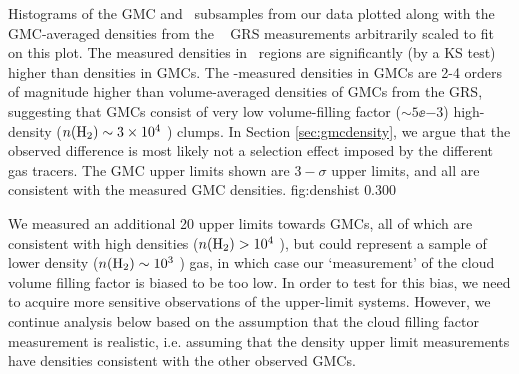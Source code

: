 
{Histograms of the GMC and \uchii\ subsamples from our data plotted along with
the GMC-averaged densities from the \thirteenco\ \citet{Roman-Duval2010} GRS
measurements arbitrarily scaled to fit on this plot.  The measured densities in
\uchii\ regions are significantly (by a KS test) higher than densities in GMCs.
The \formaldehyde-measured densities in GMCs are 2-4 orders of magnitude higher
than volume-averaged densities of GMCs from the GRS, suggesting that GMCs
consist of very low volume-filling factor ($\sim5\ee{-3}$) high-density
($n(\textrm{H}_{2})\sim3\times10^{4}$ \percc) clumps. In Section \ref{sec:gmcdensity}, we argue
that the observed difference is most likely not a selection effect imposed by
the different gas tracers.  The
GMC upper limits shown are $3-\sigma$ upper limits, and all are consistent with
the measured GMC densities.
}
{fig:denshist}
{0.30}{0}

We measured an additional 20 upper limits towards GMCs, all of which are
consistent with high densities ($n(\textrm{H}_{2})>10^4$ \percc), but could represent a sample
of lower density ($n(\textrm{H}_{2})\sim10^3$ \percc) gas, in which case our `measurement' of
the cloud volume filling factor is biased to be too low.  In order to test for
this bias, we need to acquire more sensitive observations of the upper-limit
systems.  However, we continue analysis below based on the assumption that the
cloud filling factor measurement is realistic, i.e. assuming that the density upper
limit measurements have densities consistent with the other observed GMCs.


